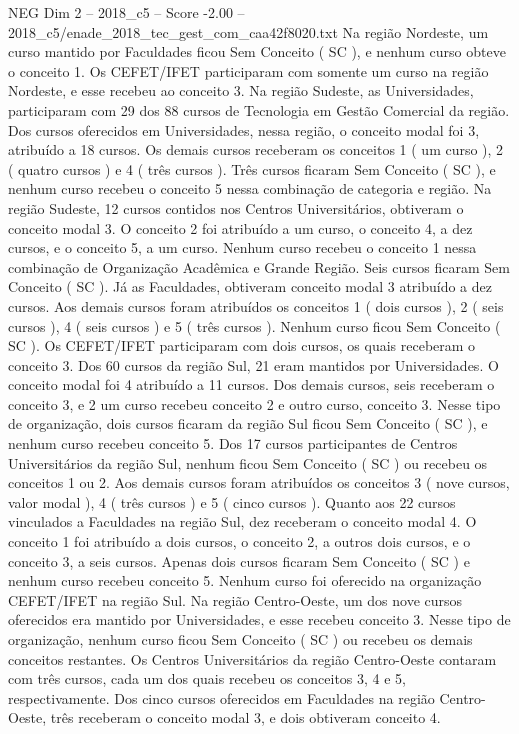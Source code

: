 \begin{textsample}{NEG Dim 2 – 2018\_c5 – Score -2.00 – 2018\_c5/enade\_2018\_tec\_gest\_com\_caa42f8020.txt}
Na região Nordeste, um curso mantido por Faculdades ficou Sem Conceito ( SC ), e nenhum curso obteve o conceito 1.
Os CEFET/IFET participaram com somente um curso na região Nordeste, e esse recebeu ao conceito 3.
Na região Sudeste, as Universidades, participaram com 29 dos 88 cursos de Tecnologia em Gestão Comercial da região.
Dos cursos oferecidos em Universidades, nessa região, o conceito modal foi 3, atribuído a 18 cursos.
Os demais cursos receberam os conceitos 1 ( um curso ), 2 ( quatro cursos ) e 4 ( três cursos ).
Três cursos ficaram Sem Conceito ( SC ), e nenhum curso recebeu o conceito 5 nessa combinação de categoria e região.
Na região Sudeste, 12 cursos contidos nos Centros Universitários, obtiveram o conceito modal 3.
O conceito 2 foi atribuído a um curso, o conceito 4, a dez cursos, e o conceito 5, a um curso.
Nenhum curso recebeu o conceito 1 nessa combinação de Organização Acadêmica e Grande Região.
Seis cursos ficaram Sem Conceito ( SC ).
Já as Faculdades, obtiveram conceito modal 3 atribuído a dez cursos.
Aos demais cursos foram atribuídos os conceitos 1 ( dois cursos ), 2 ( seis cursos ), 4 ( seis cursos ) e 5 ( três cursos ).
Nenhum curso ficou Sem Conceito ( SC ).
Os CEFET/IFET participaram com dois cursos, os quais receberam o conceito 3.
Dos 60 cursos da região Sul, 21 eram mantidos por Universidades.
O conceito modal foi 4 atribuído a 11 cursos.
Dos demais cursos, seis receberam o conceito 3, e 2 um curso recebeu conceito 2 e outro curso, conceito 3.
Nesse tipo de organização, dois cursos ficaram da região Sul ficou Sem Conceito ( SC ), e nenhum curso recebeu conceito 5.
Dos 17 cursos participantes de Centros Universitários da região Sul, nenhum ficou Sem Conceito ( SC ) ou recebeu os conceitos 1 ou 2.
Aos demais cursos foram atribuídos os conceitos 3 ( nove cursos, valor modal ), 4 ( três cursos ) e 5 ( cinco cursos ).
Quanto aos 22 cursos vinculados a Faculdades na região Sul, dez receberam o conceito modal 4.
O conceito 1 foi atribuído a dois cursos, o conceito 2, a outros dois cursos, e o conceito 3, a seis cursos.
Apenas dois cursos ficaram Sem Conceito ( SC ) e nenhum curso recebeu conceito 5.
Nenhum curso foi oferecido na organização CEFET/IFET na região Sul.
Na região Centro-Oeste, um dos nove cursos oferecidos era mantido por Universidades, e esse recebeu conceito 3.
Nesse tipo de organização, nenhum curso ficou Sem Conceito ( SC ) ou recebeu os demais conceitos restantes.
Os Centros Universitários da região Centro-Oeste contaram com três cursos, cada um dos quais recebeu os conceitos 3, 4 e 5, respectivamente.
Dos cinco cursos oferecidos em Faculdades na região Centro-Oeste, três receberam o conceito modal 3, e dois obtiveram conceito 4.

\end{textsample}
